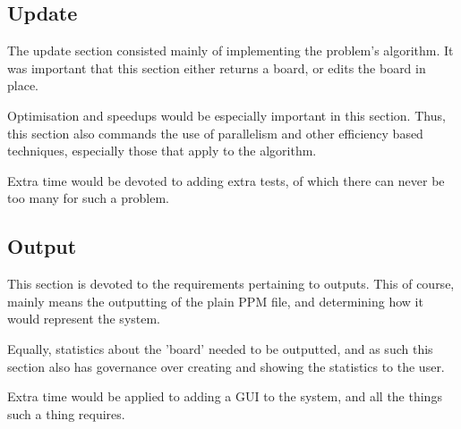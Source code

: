 	\subsection{Update}
		The update section consisted mainly of implementing the problem's algorithm.
		It was important that this section either returns a board, or edits the board in place.
		
		Optimisation and speedups would be especially important in this section.
		Thus, this section also commands the use of parallelism and other efficiency based techniques, especially those that apply to the algorithm.
		
		Extra time would be devoted to adding extra tests, of which there can never be too many for such a problem.
		
	\subsection{Output}
		This section is devoted to the requirements pertaining to outputs.
		This of course, mainly means the outputting of the plain PPM file, and determining how it would represent the system.

		Equally, statistics about the 'board' needed to be outputted, and as such this section also has governance over creating and showing the statistics to the user.

		Extra time would be applied to adding a GUI to the system, and all the things such a thing requires.
